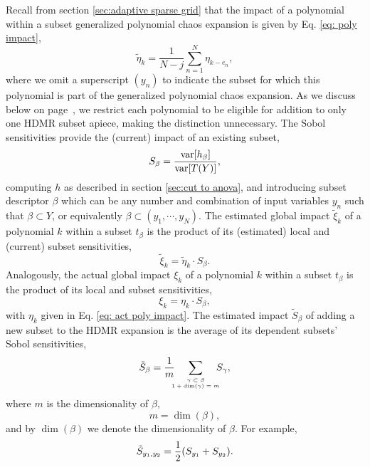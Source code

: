 Recall from section \ref{sec:adaptive sparse grid} that the impact of a polynomial within a subset generalized
polynomial chaos expansion is given by Eq. \ref{eq: poly impact},
\begin{equation}
  \tilde \eta_k = \frac{1}{N-j}\sum_{n=1}^N \eta_{k-e_n},
\end{equation}
where we omit a superscript $(y_n)$ to indicate the subset for which this polynomial is part of the generalized
polynomial chaos expansion.  As we discuss below on page~\pageref{sec: one poly per subset}, we restrict each 
polynomial to be eligible for addition to only one HDMR subset apiece, making the distinction unnecessary.  
The Sobol sensitivities provide the (current) impact of an existing subset,
\begin{equation}
  S_\beta = \frac{\text{var}\qty[h_\beta]}{\text{var}\qty[T(Y)]},
\end{equation}
computing $h$ as described in section \ref{sec:cut to anova}, and introducing subset descriptor $\beta$ which
can be any number and combination of input variables $y_n$ such that $\beta\subset Y$, or equivalently
$\beta\subset (y_1,\cdots,y_N)$.  The estimated global impact $\tilde\xi_k$ of a
polynomial $k$ within a
subset $t_\beta$ is the product of its (estimated) local and (current) subset sensitivities,
\begin{equation}
  \tilde \xi_k = \tilde\eta_k\cdot S_\beta.
\end{equation}
Analogously, the actual global impact $\xi_k$ of a polynomial $k$ within a subset $t_\beta$ is the
product of its local and subset sensitivities,
\begin{equation}
  \xi_k = \eta_k\cdot S_\beta,
\end{equation}
with $\eta_k$ given in Eq. \ref{eq: act poly impact}.
The estimated impact $\tilde S_\beta$ of adding a new subset to the HDMR expansion is the average of its
dependent subsets' Sobol sensitivities,
\begin{equation}
  \tilde S_\beta = \frac{1}{m}\hspace{-10pt} \mlsum{\gamma\subset\beta\\1+\dim(\gamma)=m}{}\hspace{-10pt} S_\gamma,
\end{equation}
where $m$ is the dimensionality of $\beta$,
\begin{equation}
  m = \dim(\beta),
\end{equation}
and by $\dim(\beta)$ we denote the dimensionality of $\beta$.  For example,
\begin{equation}
  \tilde S_{y_1,y_2} = \frac{1}{2}\qty(S_{y_1}+S_{y_2}).
\end{equation}

